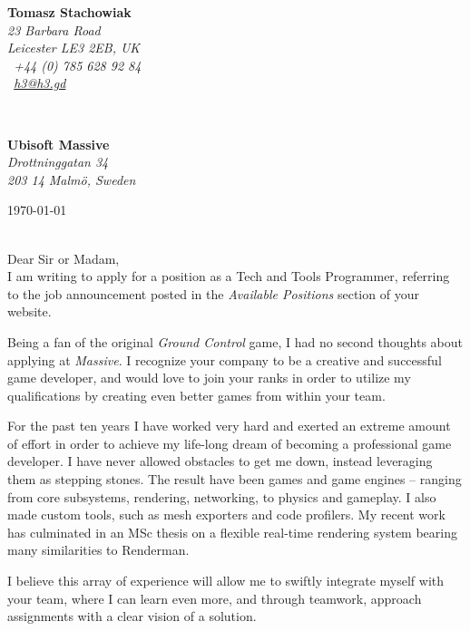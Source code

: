 \documentclass[11pt]{article}
\begin{document}
\hfill%
\begin{minipage}[t]{.6\textwidth}
\raggedleft%
{\bfseries Tomasz Stachowiak}\\[.35ex]
\small\itshape%
23 Barbara Road\\
Leicester LE3 2EB, UK\\[.35ex]
\Telefon~+44 (0) 785 628 92 84\\
\Letter~\href{mailto:h3@h3.gd}{h3@h3.gd}
\end{minipage}\\[1em]
%
\begin{minipage}[t]{.4\textwidth}
\raggedright%
{\bfseries Ubisoft Massive}\\[.35ex]
\small\itshape%
Drottninggatan 34\\
203 14 Malmö, Sweden
\end{minipage}
\hfill %
\begin{minipage}[t]{.4\textwidth}
\raggedleft %
\today
\end{minipage}\\[2em]
Dear Sir or Madam,\\[2.5em]
I am writing to apply for a position as a Tech and Tools Programmer, referring to the job announcement posted in the \emph{Available Positions} section of your website.

Being a fan of the original \emph{Ground Control} game, I had no second thoughts about applying at \emph{Massive}. I recognize your company to be a creative and successful game developer, and would love to join your ranks in order to utilize my qualifications by creating even better games from within your team.

For the past ten years I have worked very hard and exerted an extreme amount of effort in order to achieve my life-long dream of becoming a professional game developer. I have never allowed obstacles to get me down, instead leveraging them as stepping stones. The result have been games and game engines -- ranging from core subsystems, rendering, networking, to physics and gameplay. I also made custom tools, such as mesh exporters and code profilers. My recent work has culminated in an MSc thesis on a flexible real-time rendering system bearing many similarities to Renderman.

I believe this array of experience will allow me to swiftly integrate myself with your team, where I can learn even more, and through teamwork, approach assignments with a clear vision of a solution.
\end{document}
